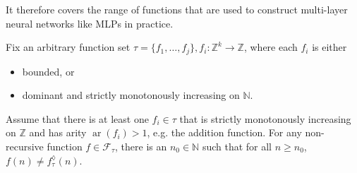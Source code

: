 It therefore covers the range of functions that are used to construct multi-layer neural networks like MLPs in practice.
\begin{theorem}
	\label{theorem:recursive-completion-not-non-recursive-expressible-integer}
	Fix an arbitrary function set $\tau=\{f_1,\dots,f_j\},f_i:\mathbb{Z}^k\to\mathbb{Z}$, where each $f_i$ is either 
	\begin{itemize}
		\item bounded, or
		\item dominant and strictly monotonously increasing on $\mathbb{N}$.
	\end{itemize}
	Assume that there is at least one $f_i\in\tau$ that is strictly monotonously increasing on $\mathbb{Z}$ and has arity $\operatorname{ar}(f_i)>1$, e.g. the addition function.
	For any non-recursive function $f\in\mathcal{F}_{\tau}$, there is an $n_0\in\mathbb{N}$ such that for all $n\geq n_0$, $f(n)\neq f_{\tau}^{\lozenge}(n)$.
\end{theorem}
